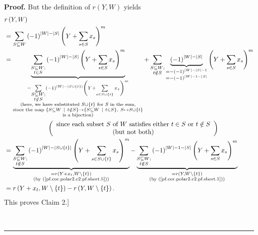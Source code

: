 \documentclass[numbers=enddot,12pt,final,onecolumn,notitlepage]{scrartcl}%
\theoremstyle{definition}
\newenvironment{proof}[1][Proof]{\noindent\textbf{#1.} }{\ \rule{0.5em}{0.5em}}
\let\sumnonlimits\sum
\renewcommand{\sum}{\sumnonlimits\limits}
\newenvironment{vershort}{}{}
\begin{document}
\begin{proof}
\begin{vershort}
But the definition of $r\left(  Y,W\right)  $ yields%
\begin{align*}
&  r\left(  Y,W\right) \\
&  =\sum_{S\subseteq W}\left(  -1\right)  ^{\left\vert W\right\vert
-\left\vert S\right\vert }\left(  Y+\sum_{s\in S}x_{s}\right)  ^{m}\\
&  =\underbrace{\sum_{\substack{S\subseteq W;\\t\in S}}\left(  -1\right)
^{\left\vert W\right\vert -\left\vert S\right\vert }\left(  Y+\sum_{s\in
S}x_{s}\right)  ^{m}}_{\substack{=\sum_{\substack{S\subseteq W;\\t\notin
S}}\left(  -1\right)  ^{\left\vert W\right\vert -\left\vert S\cup\left\{
t\right\}  \right\vert }\left(  Y+\sum_{s\in S\cup\left\{  t\right\}  }%
x_{s}\right)  ^{m}\\\text{(here, we have substituted }S\cup\left\{  t\right\}
\text{ for }S\text{ in the sum,}\\\text{since the map }\left\{  S\subseteq
W\ \mid\ t\notin S\right\}  \rightarrow\left\{  S\subseteq W\ \mid\ t\in
S\right\}  ,\ S\mapsto S\cup\left\{  t\right\}  \\\text{is a bijection)}%
}}+\sum_{\substack{S\subseteq W;\\t\notin S}}\underbrace{\left(  -1\right)
^{\left\vert W\right\vert -\left\vert S\right\vert }}_{\substack{=-\left(
-1\right)  ^{\left\vert W\right\vert -\left\vert S\right\vert -1}\\=-\left(
-1\right)  ^{\left\vert W\right\vert -1-\left\vert S\right\vert }}}\left(
Y+\sum_{s\in S}x_{s}\right)  ^{m}\\
&  \ \ \ \ \ \ \ \ \ \ \ \ \ \ \ \ \ \ \ \ \left(
\begin{array}
[c]{c}%
\text{since each subset }S\text{ of }W\text{ satisfies either }t\in S\text{ or
}t\notin S\\
\text{(but not both)}%
\end{array}
\right) \\
&  =\underbrace{\sum_{\substack{S\subseteq W;\\t\notin S}}\left(  -1\right)
^{\left\vert W\right\vert -\left\vert S\cup\left\{  t\right\}  \right\vert
}\left(  Y+\sum_{s\in S\cup\left\{  t\right\}  }x_{s}\right)  ^{m}%
}_{\substack{=r\left(  Y+x_{t},W\setminus\left\{  t\right\}  \right)
\\\text{(by (\ref{pf.cor.polar2.c2.pf.short.5}))}}}-\underbrace{\sum
_{\substack{S\subseteq W;\\t\notin S}}\left(  -1\right)  ^{\left\vert
W\right\vert -1-\left\vert S\right\vert }\left(  Y+\sum_{s\in S}x_{s}\right)
^{m}}_{\substack{=r\left(  Y,W\setminus\left\{  t\right\}  \right)
\\\text{(by (\ref{pf.cor.polar2.c2.pf.short.1}))}}}\\
&  =r\left(  Y+x_{t},W\setminus\left\{  t\right\}  \right)  -r\left(
Y,W\setminus\left\{  t\right\}  \right)  .
\end{align*}
This proves Claim 2.]
\end{vershort}


\end{proof}
\end{document}
